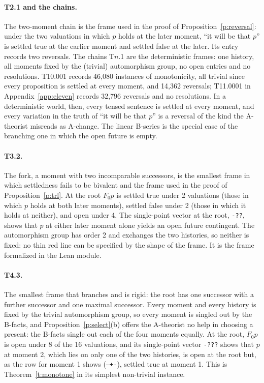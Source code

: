 \documentclass{situationist-preprint}
\begin{document}
\paragraph{T2.1 and the chains.} The two-moment chain is the frame used in the proof of Proposition~\ref{p:reversal}: under the two valuations in which $p$ holds at the later moment, \enquote{it will be that $p$} is settled true at the earlier moment and settled false at the later. Its entry records two reversals. The chains T$n$.1 are the deterministic frames: one history, all moments fixed by the (trivial) automorphism group, no open entries and no resolutions. T10.001 records 46,080 instances of monotonicity, all trivial since every proposition is settled at every moment, and 14,362 reversals; T11.0001 in Appendix~\ref{app:eleven} records 32,796 reversals and no resolutions. In a deterministic world, then, every tensed sentence is settled at every moment, and every variation in the truth of \enquote{it will be that $p$} is a reversal of the kind the A-theorist misreads as A-change. The linear B-series is the special case of the branching one in which the open future is empty.

\paragraph{T3.2.} The fork, a moment with two incomparable successors, is the smallest frame in which settledness fails to be bivalent and the frame used in the proof of Proposition~\ref{p:trl}. At the root $F_0 p$ is settled true under 2 valuations (those in which $p$ holds at both later moments), settled false under 2 (those in which it holds at neither), and open under 4. The single-point vector at the root, \texttt{-??}, shows that $p$ at either later moment alone yields an open future contingent. The automorphism group has order 2 and exchanges the two histories, so neither is fixed: no thin red line can be specified by the shape of the frame. It is the frame formalized in the Lean module.

\paragraph{T4.3.} The smallest frame that branches and is rigid: the root has one successor with a further successor and one maximal successor. Every moment and every history is fixed by the trivial automorphism group, so every moment is singled out by the B-facts, and Proposition~\ref{p:select}(b) offers the A-theorist no help in choosing a present: the B-facts single out each of the four moments equally. At the root, $F_0 p$ is open under 8 of the 16 valuations, and its single-point vector \texttt{-???} shows that $p$ at moment 2, which lies on only one of the two histories, is open at the root but, as the row for moment 1 shows (\texttt{--+-}), settled true at moment 1. This is Theorem~\ref{t:monotone} in its simplest non-trivial instance.
\end{document}
